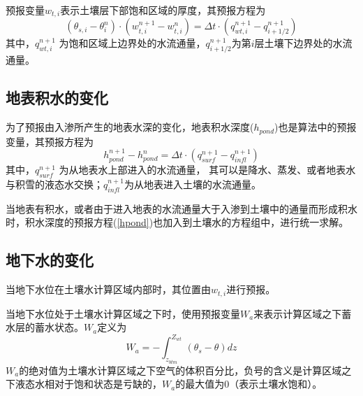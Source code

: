 预报变量$w_{t,i}$表示土壤层下部饱和区域的厚度，其预报方程为
\begin{equation}\label{si_in3}
\left(\theta_{s, i}-\theta_{i}^{n}\right) \cdot\left(w_{t, i}^{n+1}-w_{t, i}^{n}\right)=\Delta t \cdot\left(q_{w t, i}^{n+1}-q_{i+1 / 2}^{n+1}\right)
\end{equation}
其中，$q_{wt,i}^{n+1}$  为饱和区域上边界处的水流通量，$q_{i+1/2}^{n+1}$为第$i$层土壤下边界处的水流通量。



\subsection{地表积水的变化}
为了预报由入渗所产生的地表水深的变化，地表积水深度($h_{pond}$)也是算法中的预报变量，其预报方程为
\begin{equation}\label{hpond}
h_{ {pond }}^{n+1}-h_{ {pond }}^{n}=\Delta t \cdot\left(q_{ {surf }}^{n+1}-q_{ {infl }}^{n+1}\right)
\end{equation}
其中，$q_{surf}^{n+1} $ 为从地表水上部进入的水流通量，
其可以是降水、蒸发、或者地表水与积雪的液态水交换；$q_{infl}^{n+1}$为从地表进入土壤的水流通量。


当地表有积水，或者由于进入地表的水流通量大于入渗到土壤中的通量而形成积水时，积水深度的预报方程(\ref{hpond})也加入到土壤水的方程组中，进行统一求解。


\subsection{地下水的变化}
当地下水位在土壤水计算区域内部时，其位置由$w_{t,i}$进行预报。

当地下水位处于土壤水计算区域之下时，使用预报变量$W_a$来表示计算区域之下蓄水层的蓄水状态。$W_a$定义为
\begin{equation}
W_{a}=-\int_{z_{b t m}}^{Z_{w t}}\left(\theta_{s}-\theta\right) d z
\end{equation}
$W_a$的绝对值为土壤水计算区域之下空气的体积百分比，负号的含义是计算区域之下液态水相对于饱和状态是亏缺的，$W_a$的最大值为0（表示土壤水饱和）。


